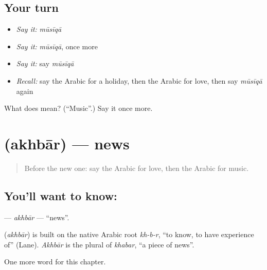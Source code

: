 \subsection*{Your turn}
\begin{itemize}
\raggedright
  \item \emph{Say it:} \emph{mūsīqā}
  \item \emph{Say it:} \emph{mūsīqā}, once more
  \item \emph{Say it:} say \emph{mūsīqā}
  \item \emph{Recall:} say the Arabic for a holiday, then the Arabic for love, then say \emph{mūsīqā} again
\end{itemize}

\begin{tcolorbox}[breakable,colback=teal!4,colframe=teal!35!black,title={Before you move on}]
What does  mean? (\textquotedblleft{}Music\textquotedblright{}.) Say it once more.
\end{tcolorbox}
\section[\texorpdfstring{\ar{أخبار} (akhbār)}{أخبار (akhbār)}]{ (akhbār) — news}

\label{lesson:AR-C99-akhbar}



\begin{quote}
Before the new one: say the Arabic for love, then the Arabic for music.
\end{quote}

\subsection*{You'll want to know: }
\textbf{} — \emph{akhbār} — \textquotedblleft{}news\textquotedblright{}.

\begin{cousinweb}
\textbf{} (\emph{akhbār}) is built on the native Arabic root \emph{kh-b-r}, \textquotedblleft{}to know, to have experience of\textquotedblright{} (Lane). \emph{Akhbār} is the plural of \emph{khabar}, \textquotedblleft{}a piece of news\textquotedblright{}.
\end{cousinweb}

\begin{grammarlens}[title={What you've built}]
One more word for this chapter.
\end{grammarlens}

